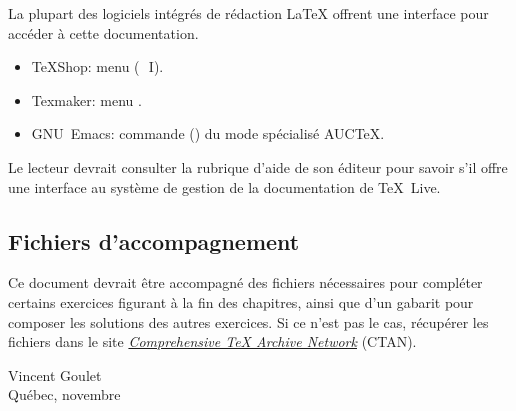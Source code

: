 La plupart des logiciels intégrés de rédaction {\LaTeX} offrent une
interface pour accéder à cette documentation.
\begin{itemize}
\item TeXShop: menu  (\optkey\,\cmdkey\, I).
\item Texmaker: menu .
\item GNU~Emacs: commande  () du mode
  spécialisé AUC{\TeX}.
\end{itemize}
Le lecteur devrait consulter la rubrique d'aide de son éditeur pour
savoir s'il offre une interface au système de gestion de la
documentation  de {\TeX}~Live.

\subsection*{Fichiers d'accompagnement}

Ce document devrait être accompagné des fichiers nécessaires pour
compléter certains exercices figurant à la fin des chapitres, ainsi
que d'un gabarit  pour composer les
solutions des autres exercices. Si ce n'est pas le cas, récupérer les
fichiers dans le site \href{\ctanurl}{\emph{Comprehensive TeX Archive
    Network}} (CTAN).

\begin{flushright}
  Vincent Goulet \\
  Québec, novembre \year
\end{flushright}

